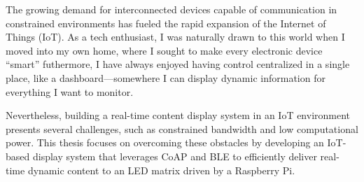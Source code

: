 The growing demand for interconnected devices capable of communication in constrained environments has fueled the rapid expansion of the Internet of Things (IoT). As a tech enthusiast, I was naturally drawn to this world when I moved into my own home, where I sought to make every electronic device “smart” futhermore, I have always enjoyed having control centralized in a single place, like a dashboard—somewhere I can display dynamic information for everything I want to monitor.

Nevertheless, building a real-time content display system in an IoT environment presents several challenges, such as constrained bandwidth and low computational power. This thesis focuses on overcoming these obstacles by developing an IoT-based display system that leverages CoAP and BLE to efficiently deliver real-time dynamic content to an LED matrix driven by a Raspberry Pi.

